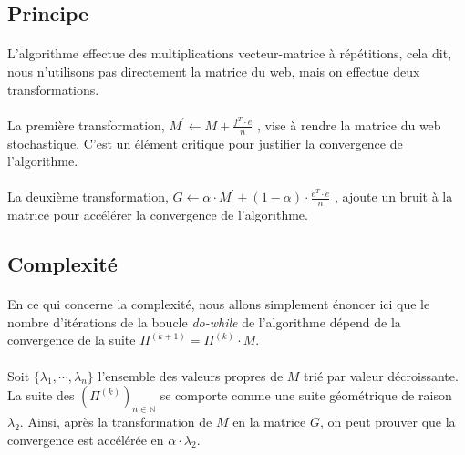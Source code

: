 	\subsection{Principe}
	
		\paragraph{}L'algorithme effectue des multiplications vecteur-matrice à répétitions, cela dit, nous n'utilisons pas directement la matrice du web, mais on effectue deux transformations.
		\paragraph{}La première transformation, $M^{'} \gets M + \frac{f^{T} \cdot e}{n}$ , vise à rendre la matrice du web stochastique. C'est un élément critique pour justifier la convergence de l'algorithme.
		\paragraph{}La deuxième transformation, $G \gets \alpha \cdot M^{'} + (1 - \alpha) \cdot \frac{e^{T} \cdot e}{n}$ , ajoute un bruit à la matrice pour accélérer la convergence de l'algorithme.

	\subsection{Complexité}
		
		\paragraph{}En ce qui concerne la complexité, nous allons simplement énoncer ici que le nombre d'itérations de la boucle \textit{do-while} de l'algorithme dépend de la convergence de la suite $\Pi^{(k + 1)} = \Pi^{(k)} \cdot M$.
		\paragraph{}Soit $\{\lambda_{1}, \cdots, \lambda_{n} \}$ l'ensemble des valeurs propres de $M$ trié par valeur décroissante. La suite des $(\Pi^{(k)})_{n \in \mathbb{N}}$ se comporte comme une suite géométrique de raison $\lambda_{2}$. Ainsi, après la transformation de $M$ en la matrice $G$, on peut prouver que la convergence est accélérée en $\alpha \cdot \lambda_{2}$.
